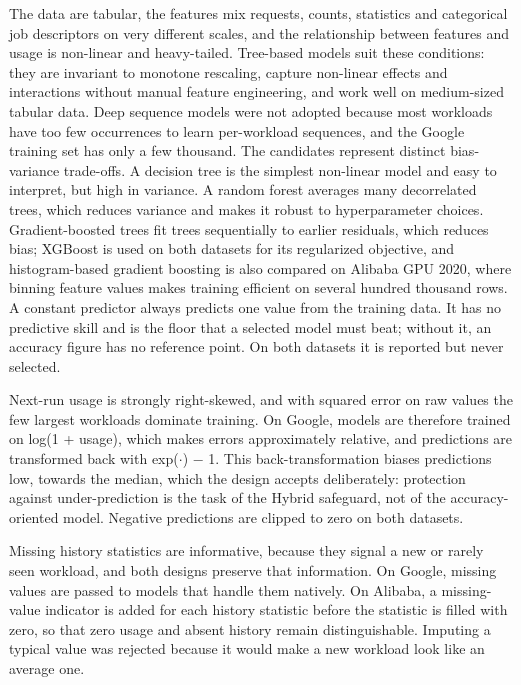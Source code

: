 The data are tabular, the features mix requests, counts, statistics and categorical job descriptors on very different scales, and the relationship between features and usage is non-linear and heavy-tailed. Tree-based models suit these conditions: they are invariant to monotone rescaling, capture non-linear effects and interactions without manual feature engineering, and work well on medium-sized tabular data. Deep sequence models were not adopted because most workloads have too few occurrences to learn per-workload sequences, and the Google training set has only a few thousand. The candidates represent distinct bias-variance trade-offs. A decision tree is the simplest non-linear model and easy to interpret, but high in variance. A random forest averages many decorrelated trees, which reduces variance and makes it robust to hyperparameter choices. Gradient-boosted trees fit trees sequentially to earlier residuals, which reduces bias; XGBoost is used on both datasets for its regularized objective, and histogram-based gradient boosting is also compared on Alibaba GPU 2020, where binning feature values makes training efficient on several hundred thousand rows. A constant predictor always predicts one value from the training data. It has no predictive skill and is the floor that a selected model must beat; without it, an accuracy figure has no reference point. On both datasets it is reported but never selected.

Next-run usage is strongly right-skewed, and with squared error on raw values the few largest workloads dominate training. On Google, models are therefore trained on log(1 + usage), which makes errors approximately relative, and predictions are transformed back with exp($\cdot$) $-$ 1. This back-transformation biases predictions low, towards the median, which the design accepts deliberately: protection against under-prediction is the task of the Hybrid safeguard, not of the accuracy-oriented model. Negative predictions are clipped to zero on both datasets.

Missing history statistics are informative, because they signal a new or rarely seen workload, and both designs preserve that information. On Google, missing values are passed to models that handle them natively. On Alibaba, a missing-value indicator is added for each history statistic before the statistic is filled with zero, so that zero usage and absent history remain distinguishable. Imputing a typical value was rejected because it would make a new workload look like an average one.


